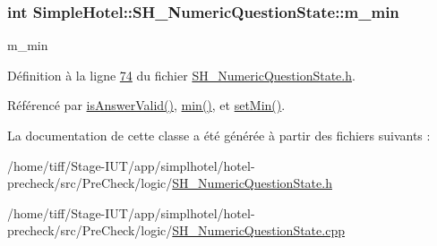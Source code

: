 \hypertarget{classSimpleHotel_1_1SH__NumericQuestionState_a7fa94f78685336ee3635ce86a80f6908}{
\subsubsection[{m\-\_\-min}]{\setlength{\rightskip}{0pt plus 5cm}int Simple\-Hotel\-::\-S\-H\-\_\-\-Numeric\-Question\-State\-::m\-\_\-min\hspace{0.3cm}{\ttfamily [private]}}}\label{classSimpleHotel_1_1SH__NumericQuestionState_a7fa94f78685336ee3635ce86a80f6908}


m\-\_\-min 



Définition à la ligne \hyperlink{SH__NumericQuestionState_8h_source_l00074}{74} du fichier \hyperlink{SH__NumericQuestionState_8h_source}{S\-H\-\_\-\-Numeric\-Question\-State.\-h}.



Référencé par \hyperlink{classSimpleHotel_1_1SH__NumericQuestionState_acfef357cecf511d31d2c992252b91c40}{is\-Answer\-Valid()}, \hyperlink{classSimpleHotel_1_1SH__NumericQuestionState_a3417b383fb91874a6176b9fd1e19e6a4}{min()}, et \hyperlink{classSimpleHotel_1_1SH__NumericQuestionState_aab2dfbe0a552dda59184db9e4d9befe5}{set\-Min()}.



La documentation de cette classe a été générée à partir des fichiers suivants \-:\begin{DoxyCompactItemize}
\item 
/home/tiff/\-Stage-\/\-I\-U\-T/app/simplhotel/hotel-\/precheck/src/\-Pre\-Check/logic/\hyperlink{SH__NumericQuestionState_8h}{S\-H\-\_\-\-Numeric\-Question\-State.\-h}\item 
/home/tiff/\-Stage-\/\-I\-U\-T/app/simplhotel/hotel-\/precheck/src/\-Pre\-Check/logic/\hyperlink{SH__NumericQuestionState_8cpp}{S\-H\-\_\-\-Numeric\-Question\-State.\-cpp}\end{DoxyCompactItemize}
